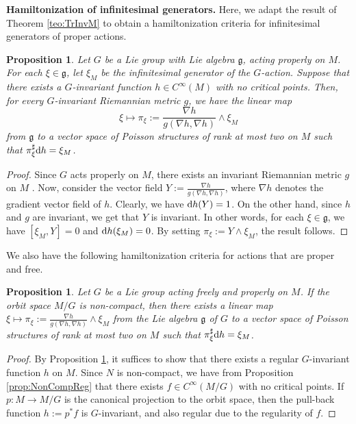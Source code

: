 \documentclass[pdftex]{sigma}%
\newcommand{\dd}{{\rm d}}
\numberwithin{equation}{section}
\newtheorem{Proposition}[Theorem]{Proposition}
 { \theoremstyle{definition}
\newtheorem{Definition}[Theorem]{Definition}
\newtheorem{Note}[Theorem]{Note}
\newtheorem{Example}[Theorem]{Example}
\newtheorem{Remark}[Theorem]{Remark} }
\begin{document}
{\bf Hamiltonization of infinitesimal generators.} Here, we adapt the result of Theorem \ref{teo:TrInvM} to obtain a hamiltonization criteria for infinitesimal generators of proper actions.

\begin{Proposition}\label{prop:InfHam}
Let $G$ be a Lie group with Lie algebra $\mathfrak{g}$, acting properly on $M$. For each $\xi \in \mathfrak{g}$, let $\xi_{M}$ be the infinitesimal generator of the $G$-action.
Suppose that there exists a $G$-invariant function $h \in C^{\infty}(M)$ with no critical points.
Then, for every $G$-invariant Riemannian metric $g$, we have the linear map
 \begin{equation*}
 \xi \mapsto \pi_{\xi}:=\frac{\nabla h}{g(\nabla h,\nabla h)}\wedge\xi_{M}
 \end{equation*}
from $\mathfrak{g}$ to a vector space of Poisson structures of rank at most two on $M$ such that $\pi_{\xi}^{\sharp}\dd h = \xi_{M}$.
\end{Proposition}
\begin{proof}
Since $G$ acts properly on $M$, there exists an invariant Riemannian metric $g$ on $M$ \cite[Proposition 2.5.2]{Duistermaat-1999}. Now, consider the vector field $Y := \tfrac{\nabla h}{g(\nabla h,\nabla h)}$, where $\nabla h$ denotes the gradient vector field of $h$. Clearly, we have $\dd h(Y) = 1$. On the other hand, since $h$ and $g$ are invariant, we get that $Y$ is invariant. In other words, for each $\xi \in \mathfrak{g}$, we have $[\xi_{M},Y] = 0$ and $\dd h(\xi_{M}) = 0$. By setting $\pi_{\xi} := Y \wedge \xi_{M}$, the result follows.
\end{proof}

We also have the following hamiltonization criteria for actions that are proper and free.

\begin{Proposition}\label{prop:InfHam2}
Let $G$ be a Lie group acting freely and properly on $M$. If the orbit space $M/G$ is non-compact, then there exists a linear map $\xi \mapsto \pi_{\xi}:=\frac{\nabla h}{g(\nabla h,\nabla h)}\wedge\xi_{M}$ from the Lie algebra $\mathfrak{g}$ of $G$ to a vector space of Poisson structures of rank at most two on $M$ such that $\pi_{\xi}^{\sharp}\dd h = \xi_{M}$.
\end{Proposition}
\begin{proof}
By Proposition \ref{prop:InfHam}, it suffices to show that there exists a regular $G$-invariant function $h$ on $M$. Since $N$ is non-compact, we have from Proposition \ref{prop:NonCompReg} that there exists $f \in C^{\infty}(M/G)$ with no critical points. If $p\colon M\to M/G$ is the canonical projection to the orbit space, then the pull-back function $h:=p^{*}f$ is $G$-invariant, and also regular due to the regularity of $f$.
\end{proof}
\end{document}
